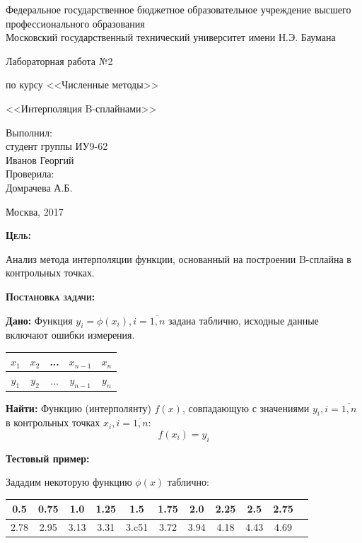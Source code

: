 \documentclass [12pt]{article}
\title{}
\date{}
\author{}
\begin{document}
\begin{titlepage}
\thispagestyle{empty}
\begin{center}
Федеральное государственное бюджетное образовательное учреждение высшего профессионального образования \\Московский государственный технический университет имени Н.Э. Баумана

\end{center}
\vfill
\centerline{\large{Лабораторная работа №2}}
\centerline{\large{по курсу <<Численные методы>>}}
\centerline{\large{<<Интерполяция B-сплайнами>>}}
\vfill
\hfill\parbox{5cm} {
           Выполнил:\\
           студент группы ИУ9-62 \hfill \\
           Иванов Георгий\hfill \medskip\\
           Проверила:\\
           Домрачева А.Б.\hfill
       }
\centerline{Москва, 2017}
\clearpage
\end{titlepage}

\textsc{\textbf{Цель:}} 

Анализ метода интерполяции функции, основанный на построении B-сплайна в контрольных точках.

\textsc{\textbf{Постановка задачи:}} 

\textbf{Дано:}  Функция $y_i = \phi(x_i),  i = \overline{1,n}$ задана таблично, исходные данные включают ошибки измерения.

\begin{table}[h]
\begin{center}
\begin{tabular}{|c|c|c|c|c|}
\hline
$x_1$ & $x_2$ & ... & $x_{n-1}$ & $x_n$ \\
\hline
$y_1$ & $y_2$ & ... & $y_{n-1}$ & $y_n$ \\
\hline
\end{tabular}
\end{center}
\end{table}

\textbf{Найти:} Функцию (интерполянту) $f(x)$, совпадающую с значениями $y_i, i = \overline{1,n}$ в контрольных точках $x_i, i = \overline{1,n}$:
$$f(x_i)=y_i$$

\textbf{Тестовый пример:} 

Зададим некоторую функцию $\phi(x)$ таблично:

\begin{table}[h]
\begin{center}
\begin{tabular}{|c|c|c|c|c|c|c|c|c|c|c|}
\hline
0.5 & 0.75 & 1.0 & 1.25 & 1.5 & 1.75 & 2.0 & 2.25 & 2.5 & 2.75\\
\hline
2.78 & 2.95 & 3.13 & 3.31 & 3.c51 & 3.72 & 3.94 & 4.18 & 4.43 & 4.69\\
\hline
\end{tabular}
\end{center}
\end{table}
\end{document}

